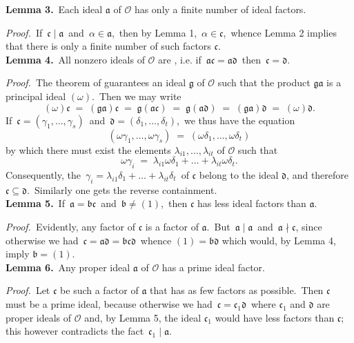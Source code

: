\documentclass[12pt]{article}
\theoremstyle{definition}
\begin{document}
\textbf{Lemma 3.}\, Each ideal $\mathfrak{a}$ of $\mathcal{O}$ has only a finite number of ideal factors.

\emph{Proof.}\, If \,$\mathfrak{c \mid a}$\, and\, $\alpha \in \mathfrak{a}$,\, then by Lemma 1,\, 
$\alpha \in \mathfrak{c}$,\, whence Lemma 2 implies that there is only a finite number of such factors $\mathfrak{c}$.\\

\textbf{Lemma 4.}\, All nonzero ideals of $\mathcal{O}$ are , i.e. if\, $\mathfrak{ac = ad}$\, then\, $\mathfrak{c = d}$.

\emph{Proof.}\, The theorem of  guarantees an ideal $\mathfrak{g}$ of $\mathcal{O}$ such that the product $\mathfrak{ga}$ is a principal ideal $(\omega)$.\, Then we may write
$$(\omega)\mathfrak{c} \;=\; \mathfrak{(ga)c} \;=\; \mathfrak{g(ac)} 
\;=\; \mathfrak{g(ad)} \;=\; \mathfrak{(ga)d} \;=\; (\omega)\mathfrak{d}.$$
If\, $\mathfrak{c} = (\gamma_1,\ldots,\gamma_s)$\, and\, $\mathfrak{d} = (\delta_1,\ldots,\delta_t)$,\, we thus have the equation
$$(\omega\gamma_1,\ldots,\omega\gamma_s) \;=\; (\omega\delta_1,\ldots,\omega\delta_t)$$
by which there must exist the elements $\lambda_{i1},\ldots,\lambda_{it}$ of $\mathcal{O}$ such that
$$\omega\gamma_i \;=\; \lambda_{i1}\omega\delta_1+\ldots+\lambda_{it}\omega\delta_t.$$
Consequently, the  \,$\gamma_i = \lambda_{i1}\delta_1+\ldots+\lambda_{it}\delta_t$\, of $\mathfrak{c}$ belong to the ideal $\mathfrak{d}$, and therefore \,$\mathfrak{c \subseteq d}$.\, Similarly one gets the reverse containment.\\

\textbf{Lemma 5.}\, If\, $\mathfrak{a = bc}$\, and\, $\mathfrak{b} \neq (1)$,\, then $\mathfrak{c}$ has less ideal factors than $\mathfrak{a}$.

\emph{Proof.}\, Evidently, any factor of $\mathfrak{c}$ is a factor of $\mathfrak{a}$.\, But\, 
$\mathfrak{a \mid a}$\, and\, $\mathfrak{a \nmid c}$, since otherwise we had\, 
$\mathfrak{c = ad = bcd}$\, whence $(1) = \mathfrak{bd}$ which would, by Lemma 4, imply $\mathfrak{b} = (1)$.\\

\textbf{Lemma 6.}\, Any proper ideal $\mathfrak{a}$ of $\mathcal{O}$ has a prime ideal factor.

\emph{Proof.}\, Let $\mathfrak{c}$ be such a factor of $\mathfrak{a}$ that has as few factors as possible.\, Then 
$\mathfrak{c}$ must be a prime ideal, because otherwise we had\, $\mathfrak{c} = \mathfrak{c}_1\mathfrak{d}$\, where 
$\mathfrak{c}_1$ and $\mathfrak{d}$ are proper ideals of $\mathcal{O}$ and, by Lemma 5, the ideal $\mathfrak{c}_1$ would have less factors than $\mathfrak{c}$; this however contradicts the fact\, $\mathfrak{c}_1 \mid \mathfrak{a}$.\\
\end{document}
